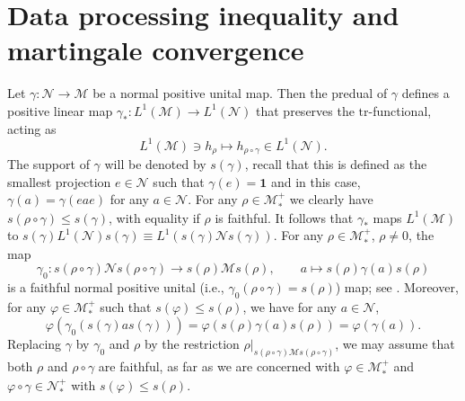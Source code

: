 \documentclass[12pt]{article}
\theoremstyle{definition}
\theoremstyle{remark}
\numberwithin{equation}{section}
\def\Me{\mathcal M}
\def\Ne{\mathcal N}
\def\Tr{\mathrm{tr}}
\def\ffi{\varphi}
\def\1{\mathbf{1}}
\begin{document}
\section{Data processing inequality and martingale convergence}

Let  $\gamma: \Ne\to \Me$ be a normal positive unital map. Then the  predual of $\gamma$  defines a 
positive linear map $\gamma_*: L^1(\Me)\to L^1(\Ne)$ that preserves the $\Tr$-functional,
acting as
\[
L^1(\Me)\ni h_\rho\mapsto h_{\rho\circ\gamma} \in L^1(\Ne).
\]
The support
of $\gamma$ will be denoted by $s(\gamma)$, recall that this is defined as the smallest projection
$e\in \Ne$ such that $\gamma(e)=\1$ and in this case, $\gamma(a)=\gamma(eae)$ for any $a\in
\Ne$. For any $\rho\in \Me_*^+$ we clearly have
$s(\rho\circ\gamma)\le s(\gamma)$, with equality if $\rho$ is faithful. 
It follows that $\gamma_*$ maps $L^1(\Me)$ to $s(\gamma)L^1(\Ne)s(\gamma)\equiv
L^1(s(\gamma)\Ne s(\gamma))$.  For any $\rho\in \Me_*^+$, $\rho\ne 0$, the map
\[
\gamma_0: {s(\rho\circ\gamma)\Ne s(\rho\circ\gamma)}\to s(\rho)\Me s(\rho),
\qquad a\mapsto s(\rho) \gamma(a)s(\rho)
\]
is a faithful normal positive unital {(i.e., $\gamma_0(\rho\circ\gamma)=s(\rho)$)} map;
{see \cite[Remark 6.7]{hiai2021lectures}.} Moreover, for any $\ffi\in \Me_*^+$ such that
$s(\ffi)\le s(\rho)$, we have for any $a\in \Ne$,
\[
\ffi(\gamma_0(s(\gamma)as(\gamma)))=\ffi(s(\rho)\gamma(a)s(\rho))={\ffi(\gamma(a)).}
\]
Replacing $\gamma$ by $\gamma_0$ and $\rho$ by the restriction
$\rho|_{s(\rho\circ\gamma)\Me s(\rho\circ\gamma)}$, we may  assume that both $\rho$
and $\rho\circ\gamma$ are faithful, as far as we are concerned with $\ffi\in\Me_*^+$ and
$\ffi\circ\gamma\in\Ne_*^+$ with $s(\ffi)\le s(\rho)$.
\end{document}
